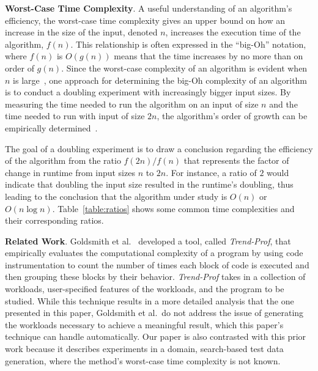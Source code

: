 {\bf Worst-Case Time Complexity}. A useful understanding of an algorithm's efficiency, the worst-case time complexity
gives an upper bound on how an increase in the size of the input, denoted $n$, increases the execution time of the
algorithm, $f(n)$.  This relationship is often expressed in the ``big-Oh'' notation, where $f(n)$ is $O(g(n))$ means
that the time increases by no more than on order of $g(n)$. Since the worst-case complexity of an algorithm is evident
when $n$ is large~\cite{goodrich2014}, one approach for determining the big-Oh complexity of an algorithm is to conduct
a doubling experiment with increasingly bigger input sizes. By measuring the time needed to run the algorithm on an
input of size $n$ and the time needed to run with input of size $2n$, the algorithm's order of growth can be
empirically determined~\cite{mcgeoch2012,sedgewick1998}.

The goal of a doubling experiment is to draw a conclusion regarding the efficiency of the algorithm from the ratio
$f(2n)/f(n)$ that represents the factor of change in runtime from input sizes $n$ to $2n$. For instance, a ratio of $2$
would indicate that doubling the input size resulted in the runtime's doubling, thus leading to the conclusion that the
algorithm under study is $O(n)$ or $O(n\log n)$.  Table~\ref{table:ratios} shows some common time complexities and their
corresponding ratios.

{\bf Related Work}. Goldsmith et al.~\cite{Goldsmith2007} developed a tool, called \textit{Trend-Prof}, that empirically
evaluates the computational complexity of a program by using code instrumentation to count the number of times each
block of code is executed and then grouping these blocks by their behavior.  \textit{Trend-Prof} takes in a collection
of workloads, user-specified features of the workloads, and the program to be studied. While this technique results in a
more detailed analysis that the one presented in this paper, Goldsmith et al.\ do not address the issue of generating
the workloads necessary to achieve a meaningful result, which this paper's technique can handle automatically.  Our
paper is also contrasted with this prior work because it describes experiments in a domain, search-based test data
generation, where the method's worst-case time complexity is not known.


